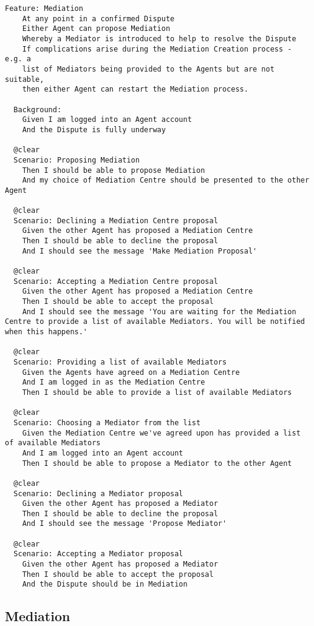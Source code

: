 \begin{lstlisting}
Feature: Mediation
    At any point in a confirmed Dispute
    Either Agent can propose Mediation
    Whereby a Mediator is introduced to help to resolve the Dispute
    If complications arise during the Mediation Creation process - e.g. a
    list of Mediators being provided to the Agents but are not suitable,
    then either Agent can restart the Mediation process.

  Background:
    Given I am logged into an Agent account
    And the Dispute is fully underway

  @clear
  Scenario: Proposing Mediation
    Then I should be able to propose Mediation
    And my choice of Mediation Centre should be presented to the other Agent

  @clear
  Scenario: Declining a Mediation Centre proposal
    Given the other Agent has proposed a Mediation Centre
    Then I should be able to decline the proposal
    And I should see the message 'Make Mediation Proposal'

  @clear
  Scenario: Accepting a Mediation Centre proposal
    Given the other Agent has proposed a Mediation Centre
    Then I should be able to accept the proposal
    And I should see the message 'You are waiting for the Mediation Centre to provide a list of available Mediators. You will be notified when this happens.'

  @clear
  Scenario: Providing a list of available Mediators
    Given the Agents have agreed on a Mediation Centre
    And I am logged in as the Mediation Centre
    Then I should be able to provide a list of available Mediators

  @clear
  Scenario: Choosing a Mediator from the list
    Given the Mediation Centre we've agreed upon has provided a list of available Mediators
    And I am logged into an Agent account
    Then I should be able to propose a Mediator to the other Agent

  @clear
  Scenario: Declining a Mediator proposal
    Given the other Agent has proposed a Mediator
    Then I should be able to decline the proposal
    And I should see the message 'Propose Mediator'

  @clear
  Scenario: Accepting a Mediator proposal
    Given the other Agent has proposed a Mediator
    Then I should be able to accept the proposal
    And the Dispute should be in Mediation
\end{lstlisting}

\subsection{Mediation}

